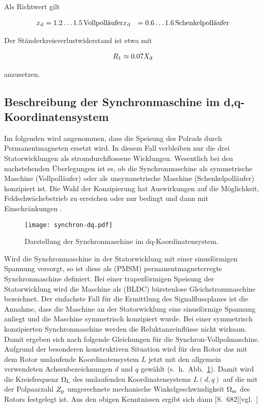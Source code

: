 Als Richtwert gilt

\begin{align*}
x_{\mathrm{d}} &= 1.2 \ldots 1.5\,\text{Vollpolläufer}
x_{\mathrm{d}} &= 0.6 \ldots 1.6\,\text{Schenkelpolläufer}
\end{align*}

Der Ständerkreisverlustwiderstand ist etwa mit 

\begin{align}
R_{\mathrm{1}} \approx 0.07 X_{\mathrm{d}}
\end{align}

anzusetzen.

\subsection{Beschreibung der Synchronmaschine im d,q-Koordinatensystem}

Im folgenden wird angenommen, dass die Speisung des Polrads durch Permanentmagneten ersetzt wird.
In diesem Fall verbleiben nur die drei Statorwicklungen als stromdurchflossene Wicklungen.
Wesentlich bei den nachstehenden Überlegungen ist es, ob die Synchronmaschine als symmetrische Maschine (Vollpolläufer) oder als unsymmetrische Maschine (Schenkelpolläufer) konzipiert ist.
Die Wahl der Konzipierung hat Auswirkungen auf die Möglichkeit, Feldschwächebetrieb zu erreichen oder nur bedingt und dann mit Einschränkungen \autocite[S.~291]{schroder2000}.

\begin{figure}[!htb]
\centering
\texttt{[image: synchron-dq.pdf]}
\label{fig:synchron-dq}
\caption{Darstellung der Synchronmaschine im dq-Koordinatensystem.}
\end{figure}

Wird die Synchronmaschine in der Statorwicklung mit einer sinusförmigen Spannung versorgt, so ist diese als (PMSM) permanentmagneterregte Synchronmaschine definiert.
Bei einer trapezförmigen Speisung der Statorwicklung wird die Maschine als (BLDC) bürstenlose Gleichstrommaschine bezeichnet.
Der einfachste Fall für die Ermittlung des Signalflussplanes ist die Annahme, dass die Maschine an der Statorwicklung eine sinusförmige Spannung anliegt und die Maschine symmetrisch konzipiert wurde.
Bei einer symmetrisch konzipierten Synchronmaschine werden die Reluktanzeinflüsse nicht wirksam.
Damit ergeben sich nach \autocite[S.~291]{schroder2000} folgende Gleichungen für die Synchron-Vollpolmaschine.
Aufgrund der besonderen konstruktiven Situation wird für den Rotor das mit dem Rotor umlaufende Koordinatensystem $L$ jetzt mit den allgemein verwendeten Achsenbezeichnungen $d$ und $q$ gewählt (s.~h.~Abb.~\ref{fig:synchron-dq}).
Damit wird die Kreisfrequenz $\Omega_{\mathrm{L}}$ des umlaufenden Koordinatensystems $L (d, q)$ auf die mit der Polpaarzahl $Z_{\mathrm{p}}$ umgerechnete mechanische Winkelgeschwindigkeit $\Omega_{\mathrm{m}}$ des Rotors festgelegt ist.
Aus den obigen Kenntnissen ergibt sich dann \autocite{schroder2001}[S.~682][vgl.~]

